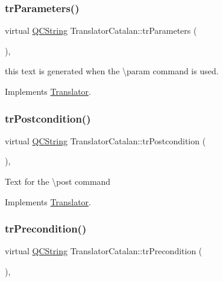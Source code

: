 \subsubsection{\texorpdfstring{trParameters()}{trParameters()}}
{\footnotesize\ttfamily virtual \mbox{\hyperlink{class_q_c_string}{Q\+C\+String}} Translator\+Catalan\+::tr\+Parameters (\begin{DoxyParamCaption}{ }\end{DoxyParamCaption})\hspace{0.3cm}{\ttfamily [inline]}, {\ttfamily [virtual]}}

this text is generated when the \textbackslash{}param command is used. 

Implements \mbox{\hyperlink{class_translator}{Translator}}.

\mbox{\label{class_translator_catalan_a10aeafe4ecf1c50ec27901f5b7cfb6b0}} 
\subsubsection{\texorpdfstring{trPostcondition()}{trPostcondition()}}
{\footnotesize\ttfamily virtual \mbox{\hyperlink{class_q_c_string}{Q\+C\+String}} Translator\+Catalan\+::tr\+Postcondition (\begin{DoxyParamCaption}{ }\end{DoxyParamCaption})\hspace{0.3cm}{\ttfamily [inline]}, {\ttfamily [virtual]}}

Text for the \textbackslash{}post command 

Implements \mbox{\hyperlink{class_translator}{Translator}}.

\mbox{\label{class_translator_catalan_a8a40d9f8c77b3bfeb148af7b9043d8e1}} 
\subsubsection{\texorpdfstring{trPrecondition()}{trPrecondition()}}
{\footnotesize\ttfamily virtual \mbox{\hyperlink{class_q_c_string}{Q\+C\+String}} Translator\+Catalan\+::tr\+Precondition (\begin{DoxyParamCaption}{ }\end{DoxyParamCaption})\hspace{0.3cm}{\ttfamily [inline]}, {\ttfamily [virtual]}}


